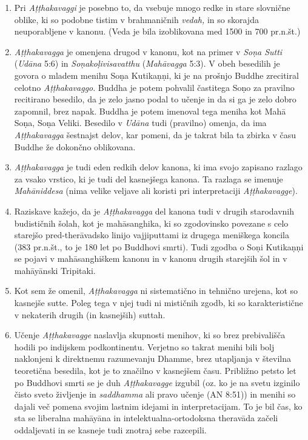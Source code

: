 \begin{enumerate}
\def\labelenumi{\arabic{enumi}.}
\item
  Pri \emph{Aṭṭhakavaggi} je posebno to, da vsebuje mnogo redke in stare
  slovnične oblike, ki so podobne tistim v brahmaničnih \emph{vedah,} in
  so skorajda neuporabljene v kanonu. (Veda je bila izoblikovana med
  1500 in 700 pr.n.št.)
\item
  \emph{Aṭṭhakavagga} je omenjena drugod v kanonu, kot na primer v
  \emph{Soṇa Sutti} (\emph{Udāna} 5:6) in \emph{Soṇakoḷivisavatthu}
  (\emph{Mahāvagga} 5:3). V obeh besedilih je govora o mladem menihu
  Soṇa Kutikaṇṇi, ki je na prošnjo Buddhe zrecitiral celotno
  \emph{Aṭṭhakavaggo}. Buddha je potem pohvalil častitega Soṇo za
  pravilno recitirano besedilo, da je zelo jasno podal to učenje in da
  si ga je zelo dobro zapomnil, brez napak. Buddha je potem imenoval
  tega meniha kot Mahā Soṇa, Soṇa Veliki. Besedilo v \emph{Udāna} tudi
  (pravilno) omenja, da ima \emph{Aṭṭhakavagga} šestnajst delov, kar
  pomeni, da je takrat bila ta zbirka v času Buddhe že dokončno
  oblikovana.
\item
  \emph{Aṭṭhakavagga} je tudi eden redkih delov kanona, ki ima svojo
  zapisano razlago za vsako vrstico, ki je tudi del kasnejšega kanona.
  Ta razlaga se imenuje \emph{Mahāniddesa} (nima velike veljave ali
  koristi pri interpretaciji \emph{Aṭṭhakavagge}).
\item
  Raziskave kažejo, da je \emph{Aṭṭhakavagga} del kanona tudi v drugih
  starodavnih budističnih šolah, kot je mahāsanghika, ki so zgodovinsko
  povezane s celo starejšo pred-therāvadsko linijo vajjiputtami iz
  drugega meniškega koncila (383 pr.n.št., to je 180 let po Buddhovi
  smrti). Tudi zgodba o Soṇi Kutikaṇṇi se pojavi v mahāsanghiškem kanonu
  in v kanonu drugih starejših šol in v mahāyānski Tripitaki.
\item
  Kot sem že omenil, \emph{Aṭṭhakavagga} ni sistematično in tehnično
  urejena, kot so kasnejše sutte. Poleg tega v njej tudi ni mističnih
  zgodb, ki so karakteristične v nekaterih drugih (in kasnejših) suttah.
\item
  Učenje \emph{Aṭṭhakavagge} naslavlja skupnosti menihov, ki so brez
  prebivališča hodili po indijskem podkontinentu. Verjetno so takrat
  menihi bili bolj naklonjeni k direktnemu razumevanju Dhamme, brez
  utapljanja v številna teoretična besedila, kot je to značilno v
  kasnejšem času. Približno petsto let po Buddhovi smrti se je duh
  \emph{Aṭṭhakavagge} izgubil (oz. ko je na svetu izginilo čisto sveto
  življenje in \emph{saddhamma} ali pravo učenje (AN 8:51)) in menihi so
  dajali več pomena svojim lastnim idejami in interpretacijam. To je bil
  čas, ko sta se liberalna mahāyāna in intelektualna-ortodoksna
  theravāda začeli oddaljevati in se kasneje tudi znotraj sebe
  razcepili.
\end{enumerate}

